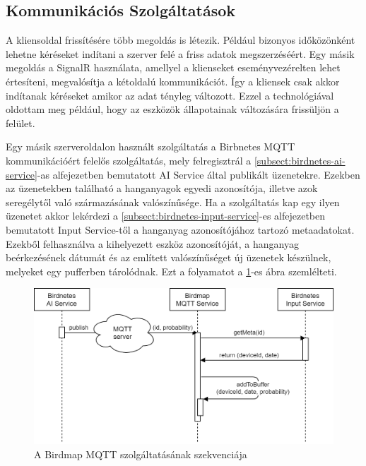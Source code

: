 \subsection{Kommunikációs Szolgáltatások}
A kliensoldal frissítésére több megoldás is létezik. Például bizonyos időközönként lehetne kéréseket indítani a szerver felé a friss adatok megszerzéséért.
Egy másik megoldás a SignalR használata, amellyel a klienseket eseményvezérelten lehet értesíteni, megvalósítja a kétoldalú kommunikációt.
Így a kliensek csak akkor indítanak kéréseket amikor az adat tényleg változott. Ezzel a technológiával oldottam meg például, hogy az eszközök állapotainak változására
frissüljön a felület.

Egy másik szerveroldalon használt szolgáltatás a Birbnetes MQTT kommunikációért felelős szolgáltatás, 
mely felregisztrál a \ref{subsect:birdnetes-ai-service}-as alfejezetben bemutatott AI Service által publikált üzenetekre.
Ezekben az üzenetekben található a hanganyagok egyedi azonosítója, illetve azok seregélytől való származásának valószínűsége.
Ha a szolgáltatás kap egy ilyen üzenetet akkor lekérdezi a \ref{subsect:birdnetes-input-service}-es alfejezetben bemutatott Input Service-től
a hanganyag azonosítójához tartozó metaadatokat. 
Ezekből felhasználva a kihelyezett eszköz azonosítóját, a hanganyag beérkezésének dátumát és az említett valószínűséget új üzenetek készülnek, melyeket egy pufferben tárolódnak.
Ezt a folyamatot a \ref{fig:birdmap-mqtt-service}-es ábra szemlélteti.

\begin{figure}[!ht]
    \centering
    \includegraphics[width=150mm, keepaspectratio]{figures/mqtt-communication-sequence.png}
    \caption{A Birdmap MQTT szolgáltatásának szekvenciája}
    \label{fig:birdmap-mqtt-service}
\end{figure}

